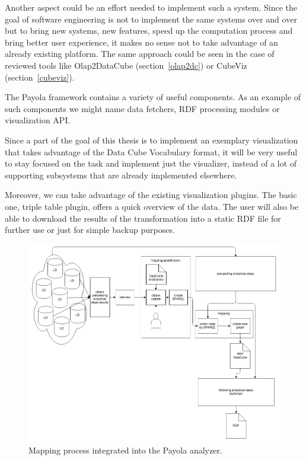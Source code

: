 Another aspect could be an effort needed to implement such a system. Since the 
goal of software engineering is not to implement the same systems over and over 
but to bring new systems, new features, speed up the computation process and 
bring better user experience, it makes no sense not to take advantage of 
an already existing platform. The same approach could be seen in the case of reviewed 
tools like Olap2DataCube (section~\ref{olap2dc}) or CubeViz 
(section~\ref{cubeviz}).

The Payola framework contains a variety of useful components. As an example of 
such components we might name data fetchers, RDF processing modules or 
visualization API.

Since a part of the goal of this thesis is to implement an exemplary 
visualization that takes advantage of the Data Cube Vocabulary format, it will 
be very useful to stay focused on the task and implement just the visualizer, 
instead of a lot of supporting subsystems that are already 
implemented elsewhere.

Moreover, we can take advantage of the existing visualization plugins. The basic 
one, triple table plugin, offers a quick overview of the data. The user 
will also be able to download the results of the transformation into a static 
RDF file for further use or just for simple backup purposes.

\begin{figure}
	\centering
	\includegraphics[width=140mm]{img/payola-mapping.png}
	\caption{Mapping process integrated into the Payola analyzer.}
	\label{fig:payola-mapping}
\end{figure}

